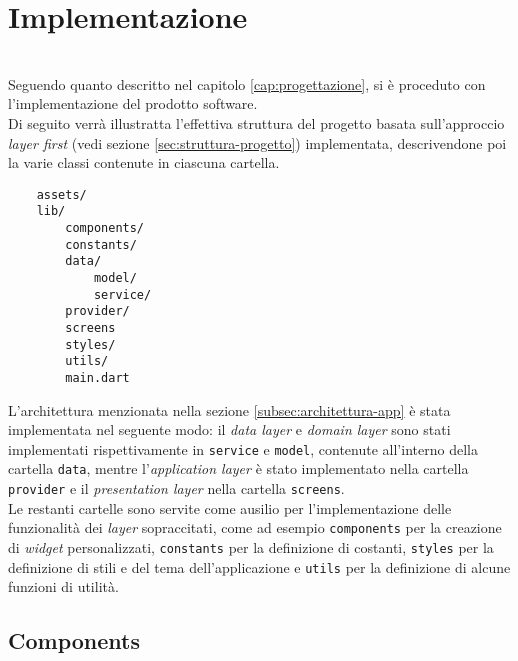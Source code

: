 \chapter{Implementazione}
\label{cap:implementazione}

\\

Seguendo quanto descritto nel capitolo \ref{cap:progettazione}, si è proceduto con l'implementazione del prodotto software.\\
Di seguito verrà illustratta l'effettiva struttura del progetto basata sull'approccio \emph{layer first} (vedi sezione \ref{sec:struttura-progetto}) implementata, descrivendone poi la varie classi contenute in ciascuna cartella. \\

\begin{verbatim}
    assets/
    lib/
        components/
        constants/
        data/
            model/
            service/
        provider/
        screens
        styles/
        utils/
        main.dart
\end{verbatim}

L'architettura menzionata nella sezione \ref{subsec:architettura-app} è stata implementata nel seguente modo: il \emph{data layer} e \emph{domain layer} sono stati implementati rispettivamente in \lstinline{service} e \lstinline{model}, contenute all'interno della cartella \lstinline{data}, mentre l'\emph{application layer} è stato implementato nella cartella \lstinline{provider} e il \emph{presentation layer} nella cartella \lstinline{screens}.\\
Le restanti cartelle sono servite come ausilio per l'implementazione delle funzionalità dei \emph{layer} sopraccitati, come ad esempio \lstinline{components} per la creazione di \emph{widget} personalizzati, \lstinline{constants} per la definizione di costanti, \lstinline{styles} per la definizione di stili e del tema dell'applicazione e \lstinline{utils} per la definizione di alcune funzioni di utilità.\\

\section{Components}
\label{sec:components}

